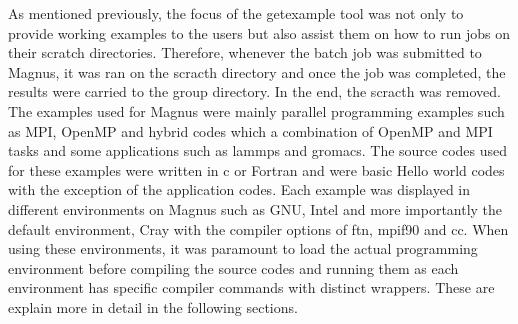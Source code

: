 \documentclass[journal]{IEEEtran}
\begin{document}
As mentioned previously, the focus of the getexample tool was not only to provide working examples to the users but also assist them on how to run jobs
on their scratch directories. Therefore, whenever the batch job was submitted to Magnus, it was ran on the scracth directory and once the job was 
completed, the results were carried to the group directory. In the end, the scracth was removed. The examples used for Magnus were mainly parallel
programming examples such as MPI, OpenMP and hybrid codes which a combination of OpenMP and MPI tasks and some applications such as lammps and gromacs.
The source codes used for these examples were written in c or Fortran and were basic Hello world codes with the exception of the application codes.
Each example was displayed in different environments on Magnus such as GNU, Intel and more importantly the default environment, Cray with the compiler
options of ftn, mpif90 and cc. When using these environments, it was paramount to load the actual programming environment before compiling the source
codes and running them as each environment has specific compiler commands with distinct wrappers. These are explain more in detail in the following
sections.
\end{document}
